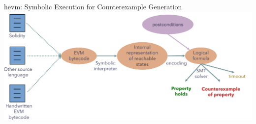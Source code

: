 \documentclass[aspectratio=169]{beamer}
\begin{document}
%	
%

\begin{frame}{hevm: Symbolic Execution for Counterexample Generation}
\centering
\includegraphics[scale=0.45]{pipeline}
\end{frame}
\end{document}
